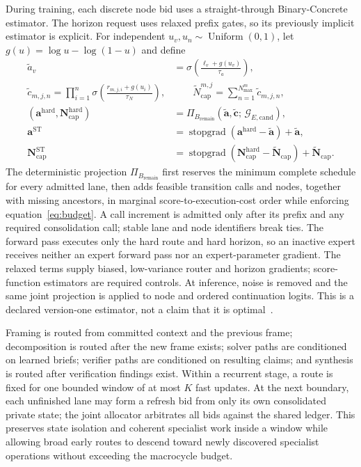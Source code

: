 \documentclass[10pt,a4paper]{article}
\newcommand{\op}[1]{\operatorname{#1}}
\newcommand{\stopgrad}{\operatorname{stopgrad}}
\newcommand{\gcand}{\mathcal{G}_{E,\mathrm{cand}}}
\begin{document}
During training, each discrete node bid uses a straight-through Binary-Concrete
estimator. The horizon request uses relaxed prefix gates, so its previously
implicit estimator is explicit. For independent
$u_v, u_n \sim \op{Uniform}(0,1)$, let $g(u) = \log u - \log(1-u)$ and define
\begin{align}
\widetilde{a}_v &= \sigma\!\left( \frac{\ell_v + g(u_v)}{\tau_a} \right), \\
\widetilde{c}_{m,j,n} = \prod_{i=1}^{n}
  \sigma\!\left( \frac{r_{m,j,i} + g(u_i)}{\tau_N} \right),
&\qquad
\widetilde{N}^{m,j}_{\mathrm{cap}} = \sum_{n=1}^{N^m_{\max}}
  \widetilde{c}_{m,j,n}, \\
(\mathbf{a}^{\mathrm{hard}}, \mathbf{N}^{\mathrm{hard}}_{\mathrm{cap}})
  &= \Pi_{B_{\mathrm{remain}}}
  (\widetilde{\mathbf{a}}, \widetilde{\mathbf{c}};\, \gcand), \\
\mathbf{a}^{\mathrm{ST}} &= \stopgrad(\mathbf{a}^{\mathrm{hard}}
  - \widetilde{\mathbf{a}}) + \widetilde{\mathbf{a}}, \\
\mathbf{N}^{\mathrm{ST}}_{\mathrm{cap}} &=
  \stopgrad(\mathbf{N}^{\mathrm{hard}}_{\mathrm{cap}}
  - \widetilde{\mathbf{N}}_{\mathrm{cap}}) + \widetilde{\mathbf{N}}_{\mathrm{cap}}.
\end{align}
The deterministic projection $\Pi_{B_{\mathrm{remain}}}$ first reserves the
minimum complete schedule for every admitted lane, then adds feasible
transition calls and nodes, together with missing ancestors, in marginal
score-to-execution-cost order while enforcing
equation~\eqref{eq:budget}. A call increment is admitted only after its prefix
and any required consolidation call; stable lane and node identifiers break
ties. The forward pass executes only the hard route and hard horizon, so an
inactive expert receives neither an expert forward pass nor an
expert-parameter gradient. The relaxed terms supply biased, low-variance
router and horizon gradients; score-function estimators are required controls.
At inference, noise is removed and the same joint projection is applied to node
and ordered continuation logits. This is a declared version-one estimator, not
a claim that it is optimal~\cite{louizos2018}.

Framing is routed from committed context and the previous frame; decomposition
is routed after the new frame exists; solver paths are conditioned on learned
briefs; verifier paths are conditioned on resulting claims; and synthesis is
routed after verification findings exist. Within a recurrent stage, a route is
fixed for one bounded window of at most $K$ fast updates. At the next boundary,
each unfinished lane may form a refresh bid from only its own consolidated
private state; the joint allocator arbitrates all bids against the shared
ledger. This preserves state isolation and coherent specialist work inside a
window while allowing broad early routes to descend toward newly discovered
specialist operations without exceeding the macrocycle budget.
\end{document}

